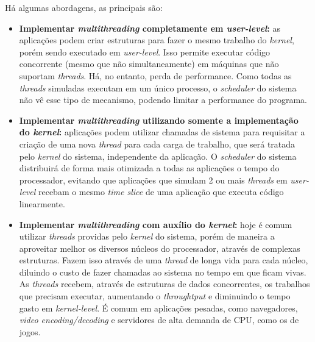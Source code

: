 \documentclass[brazilian,a4paper]{article}
\begin{document}
Há algumas abordagens, as principais são:
\begin{itemize}
    \item \textbf{Implementar \textit{multithreading} completamente em \textit{user-level}:} as aplicações podem criar estruturas para fazer o mesmo trabalho do \textit{kernel}, porém sendo executado em \textit{user-level}. Isso permite executar código concorrente (mesmo que não simultaneamente) em máquinas que não suportam \textit{threads}. Há, no entanto, perda de performance. Como todas as \textit{threads} simuladas executam em um único processo, o \textit{scheduler} do sistema não vê esse tipo de mecanismo, podendo limitar a performance do programa.
    \item \textbf{Implementar \textit{multithreading} utilizando somente a implementação do \textit{kernel}:} aplicações podem utilizar chamadas de sistema para requisitar a criação de uma nova \textit{thread} para cada carga de trabalho, que será tratada pelo \textit{kernel} do sistema, independente da aplicação. O \textit{scheduler} do sistema distribuirá de forma mais otimizada a todas as aplicações o tempo do processador, evitando que aplicações que simulam 2 ou mais \textit{threads} em \textit{user-level} recebam o mesmo \textit{time slice} de uma aplicação que executa código linearmente.
    \item \textbf{Implementar \textit{multithreading} com auxílio do \textit{kernel}:} hoje é comum utilizar \textit{threads} providas pelo \textit{kernel} do sistema, porém de maneira a aproveitar melhor os diversos núcleos do processador, através de complexas estruturas. Fazem isso através de uma \textit{thread} de longa vida para cada núcleo, diluindo o custo de fazer chamadas ao sistema no tempo em que ficam vivas. As \textit{threads} recebem, através de estruturas de dados concorrentes, os trabalhos que precisam executar, aumentando o \textit{throughtput} e diminuindo o tempo gasto em \textit{kernel-level}. É comum em aplicações pesadas, como navegadores, \textit{video encoding/decoding} e servidores de alta demanda de CPU, como os de jogos.
\end{itemize}
\end{document}
